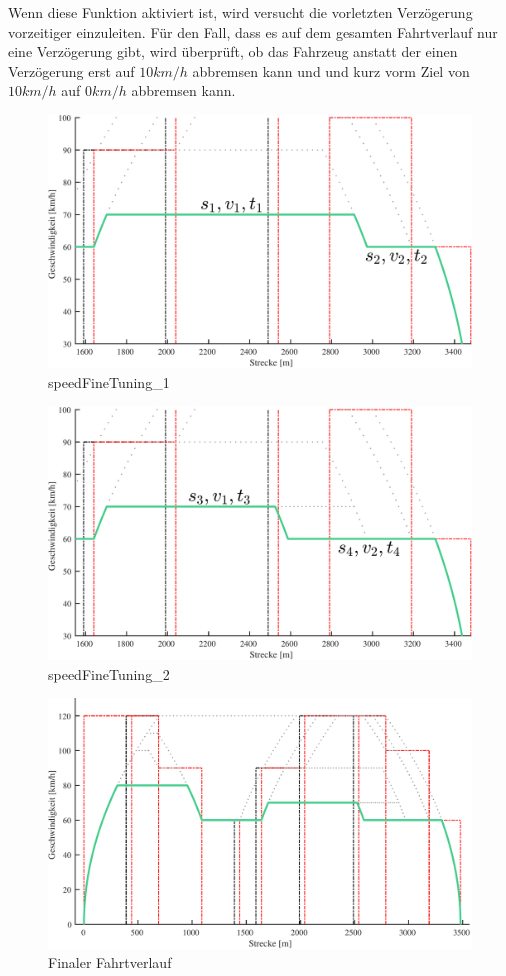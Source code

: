 Wenn diese Funktion aktiviert ist, wird versucht die vorletzten Verzögerung vorzeitiger einzuleiten. Für den Fall, dass es auf dem gesamten Fahrtverlauf nur eine Verzögerung gibt, wird überprüft, ob das Fahrzeug anstatt der einen Verzögerung erst auf $10 km/h$ abbremsen kann und und kurz vorm Ziel von $10 km/h$ auf $0 km/h$ abbremsen kann.



\begin{figure}
  \includegraphics[width=\linewidth]{../matlab/it11.pdf}
  \caption{speedFineTuning\_1}
  \label{fig:it11}
\end{figure}
\begin{figure}
  \includegraphics[width=\linewidth]{../matlab/it12.pdf}
  \caption{speedFineTuning\_2}
  \label{fig:it12}
\end{figure}
\begin{figure}
  \includegraphics[width=\linewidth]{../matlab/it13.pdf}
  \caption{Finaler Fahrtverlauf}
  \label{fig:it13}
\end{figure}

